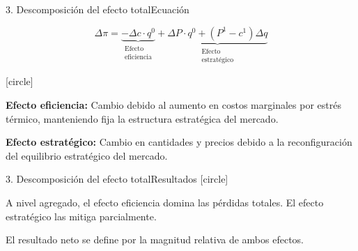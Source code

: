 \begin{frame}{3. Descomposición del efecto total}{Ecuación}
\centering

\[
\Delta\pi = \underbrace{-\Delta c \cdot q^0}_{\substack{\text{Efecto} \\ \text{eficiencia}}} + \underbrace{\Delta P \cdot q^0 + (P^1 - c^1)\Delta q}_{\substack{\text{Efecto} \\ \text{estratégico}}}
\]

[circle]
    \begin{wideitemize}
        \item <1-> \textbf{Efecto eficiencia:} Cambio debido al aumento en costos marginales por estrés térmico, manteniendo fija la estructura estratégica del mercado.

        \item <2-> \textbf{Efecto estratégico:} Cambio en cantidades y precios debido a la reconfiguración del equilibrio estratégico del mercado.
    \end{wideitemize}  

\end{frame}
\begin{frame}{3. Descomposición del efecto total}{Resultados}
    \label{frame:descomposicion1}
    [circle]
    \begin{wideitemize}
        \item A nivel agregado, el efecto eficiencia domina las pérdidas totales. El efecto estratégico las mitiga parcialmente.
        
            \vspace{0.3cm}
            
            \vspace{0.3cm}
        \item El resultado neto se define por la magnitud relativa de ambos efectos. \hyperlink{frame:efecto_estrategico1}{}
    \end{wideitemize}
\end{frame}


